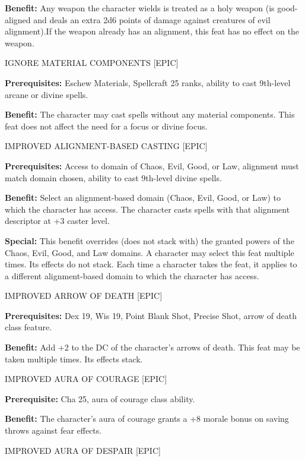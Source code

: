 \documentclass{article}
\begin{document}
\textbf{Benefit:} Any weapon the character wields is treated as a holy weapon (is 
good-aligned and deals an extra 2d6 points of damage against creatures of evil 
alignment).If the weapon already has an alignment, this feat has no effect on the 
weapon. 

\vspace{12pt}
IGNORE MATERIAL COMPONENTS [EPIC] 

\textbf{Prerequisites:} Eschew Materials, Spellcraft 25 ranks, ability to cast 
9th-level arcane or divine spells. 

\textbf{Benefit:} The character may cast spells without any material components. 
This feat does not affect the need for a focus or divine focus. 

\vspace{12pt}
IMPROVED ALIGNMENT-BASED CASTING [EPIC] 

\textbf{Prerequisites:} Access to domain of Chaos, Evil, Good, or Law, alignment 
must match domain chosen, ability to cast 9th-level divine spells. 

\textbf{Benefit:} Select an alignment-based domain (Chaos, Evil, Good, or Law) 
to which the character has access. The character casts spells with that alignment 
descriptor at +3 caster level. 

\textbf{Special:} This benefit overrides (does not stack with) the granted powers 
of the Chaos, Evil, Good, and Law domains. A character may select this feat multiple 
times. Its effects do not stack. Each time a character takes the feat, it applies 
to a different alignment-based domain to which the character has access. 

\vspace{12pt}
IMPROVED ARROW OF DEATH [EPIC] 

\textbf{Prerequisites:} Dex 19, Wis 19, Point Blank Shot, Precise Shot, arrow of 
death class feature. 

\textbf{Benefit:} Add +2 to the DC of the character's arrows of death. This feat 
may be taken multiple times. Its effects stack. 

\vspace{12pt}
IMPROVED AURA OF COURAGE [EPIC] 

\textbf{Prerequisite:} Cha 25, aura of courage class ability. 

\textbf{Benefit:} The character's aura of courage grants a +8 morale bonus on saving 
throws against fear effects. 

\vspace{12pt}
IMPROVED AURA OF DESPAIR [EPIC] 
\end{document}
